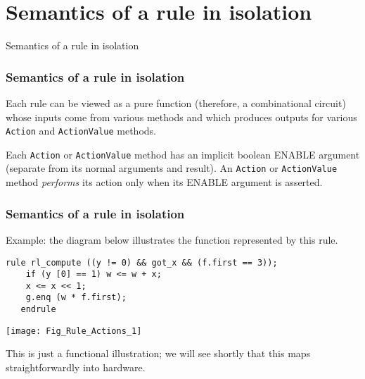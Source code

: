 
\section{Semantics of a rule in isolation}

\begin{frame}

\begin{center}
  {\LARGE Semantics of a rule in isolation}
\end{center}

\end{frame}


\begin{frame}[fragile]
\frametitle{Semantics of a rule in isolation}

\footnotesize

Each rule can be viewed as a pure function (therefore, a combinational
circuit) whose inputs come from various methods and which produces
outputs for various {\tt Action} and {\tt ActionValue} methods.

\vspace{5ex}

Each {\tt Action} or {\tt ActionValue} method has an implicit boolean
ENABLE argument (separate from its normal arguments and result).  An
{\tt Action} or {\tt ActionValue} method
\emph{performs} its action only when its ENABLE argument is asserted.

\end{frame}


\begin{frame}[fragile]
\frametitle{Semantics of a rule in isolation}

\label{isolated_rule_semantics}

\footnotesize

\begin{minipage}{0.35\textwidth}
Example: the diagram below illustrates the function represented by this rule.
\end{minipage}
\hm
\begin{minipage}{0.6\textwidth}
\begin{Verbatim}[frame=single]
   rule rl_compute ((y != 0) && got_x && (f.first == 3));
    if (y [0] == 1) w <= w + x;
    x <= x << 1;
    g.enq (w * f.first);
   endrule
\end{Verbatim}
\end{minipage}

\begin{center}
 \texttt{[image: Fig\_Rule\_Actions\_1]}

 This is just a functional illustration; we will see shortly that this
 maps straightforwardly into hardware.
\end{center}


\end{frame}

